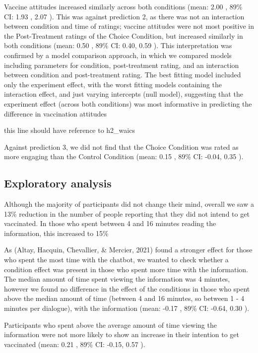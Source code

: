 \documentclass[
  english,
  ,jou,floatsintext]{apa6}
\begin{document}
Vaccine attitudes increased similarly across both conditions (mean: 2.00 , 89\% CI: 1.93 , 2.07 ). This was against prediction 2, as there was not an interaction between condition and time of ratings; vaccine attitudes were not most positive in the Post-Treatment ratings of the Choice Condition, but increased similarly in both conditions (mean: 0.50 , 89\% CI: 0.40, 0.59 ). This interpretation was confirmed by a model comparison approach, in which we compared models including parameters for condition, post-treatment rating, and an interaction between condition and post-treatment rating. The best fitting model included only the experiment effect, with the worst fitting models containing the interaction effect, and just varying intercepts (null model), suggesting that the experiment effect (across both conditions) was most informative in predicting the difference in vaccination attitudes

this line should have reference to h2\_waics

Against prediction 3, we did not find that the Choice Condition was rated as more engaging than the Control Condition (mean: 0.15 , 89\% CI: -0.04, 0.35 ).

\hypertarget{exploratory-analysis}{%
\subsection{Exploratory analysis}\label{exploratory-analysis}}

Although the majority of participants did not change their mind, overall we saw a 13\% reduction in the number of people reporting that they did not intend to get vaccinated. In those who spent between 4 and 16 minutes reading the information, this increased to 15\%

As (Altay, Hacquin, Chevallier, \& Mercier, 2021) found a stronger effect for those who spent the most time with the chatbot, we wanted to check whether a condition effect was present in those who spent more time with the information. The median amount of time spent viewing the information was 4 minutes, however we found no difference in the effect of the conditions in those who spent above the median amount of time (between 4 and 16 minutes, so between 1 - 4 minutes per dialogue), with the information (mean: -0.17 , 89\% CI: -0.64, 0.30 ).

Participants who spent above the average amount of time viewing the information were not more likely to show an increase in their intention to get vaccinated (mean: 0.21 , 89\% CI: -0.15, 0.57 ).
\end{document}

